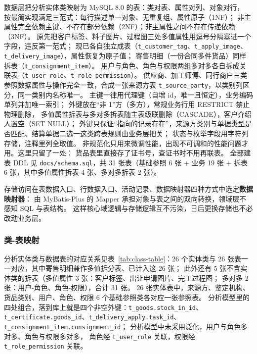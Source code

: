 \documentclass[12pt, a4paper]{ctexart}
\newcommand{\code}[1]{\texttt{\small #1}}
\begin{document}
数据层把分析实体类映射为 MySQL 8.0 的表：类对表、属性对列、对象对行，
按最简实现满足三范式：每行描述单一对象、无重复组、属性原子（1NF）；
非主属性完全依赖主键、不存在部分依赖（2NF）；非主属性之间不存在传递依赖（3NF）。
原先把客户标签、料子图片、过程图三处多值属性用逗号分隔塞进一个字段，违反第一范式；
现已各自独立成表（\code{t\_customer\_tag}、\code{t\_apply\_image}、\code{t\_delivery\_image}），属性恢复为原子值；
寄售明细（一份合同多件货品）同样拆表（\code{t\_consignment\_item}）。
用户与角色、角色与权限两组多对多各自拆成关联表（\code{t\_user\_role}、\code{t\_role\_permission}）。
供应商、加工师傅、同行商户三类参照数据属性与操作完全一致，合成一张来源方表
\code{t\_source\_party}，以类别列区分，同一类别内名称唯一。
主键一律用代理键（自增 id，唯一且恒定），业务编码单列并加唯一索引；
外键放在“非 1”方（多方），常规业务行用 RESTRICT 禁止物理删除，
多值属性拆表与多对多拆表随主表级联删除（CASCADE），客户介绍人置空（SET NULL）；
外键只保证“指向的记录存在”，来源方类别与单据类型是否匹配、结算单据二选一这类跨表规则由业务层把关；
状态与枚举字段用字符列存储，注释里列全取值。
非规范化只用来微调性能，出现不可调和的性能问题才用。这里只留了一处：
货品表里直接存了证书号，查证书时不用再联表。
全部建表 DDL 见 \code{docs/schema.sql}，共 31 张表（基础参照 6 张 + 业务 19 张 + 拆表 6 张，其中多值属性拆表 4 张、多对多拆表 2 张）。

存储访问在表数据入口、行数据入口、活动记录、数据映射器四种方式中选定\textbf{数据映射器}：
由 MyBatis-Plus 的 Mapper 承担对象与表之间的双向转换，领域层不感知 SQL 与表结构。
这样核心域逻辑与存储逻辑互不污染，日后更换存储也不必改动业务层。

\subsubsection{类-表映射}

分析实体类与数据表的对应关系见表~\ref{tab:class-table}：26 个实体类与 26 张表一一对应，其中寄售明细兼作多值拆分表、已计入这 26 张；
此外还有 5 张不含实体类的拆表（多值属性 3 张：客户标签、出让申请图片、完工过程图；
多对多 2 张：用户-角色、角色-权限），合计 31 张。
26 张实体表中，来源方、鉴定机构、货品类别、用户、角色、权限 6 个基础参照类各对应一张参照表。
分析模型里的四处组合，落到库上就是四个非空外键：\code{t\_goods.stock\_in\_id}、
\code{t\_certificate.goods\_id}、\code{t\_delivery\_apply.task\_id}、\code{t\_consignment\_item.consignment\_id}；
分析模型中未采用泛化，用户与角色多对多、角色与权限多对多，
角色经 \code{t\_user\_role} 关联，权限经 \code{t\_role\_permission} 关联。
\end{document}
